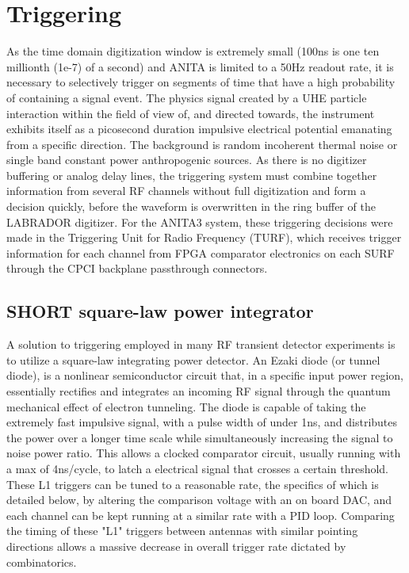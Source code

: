 \section{Triggering}
	As the time domain digitization window is extremely small (100ns is one ten millionth (1e-7) of a second) and ANITA is limited to a 50Hz readout rate, it is necessary to selectively trigger on segments of time that have a high probability of containing a signal event.  The physics signal created by a UHE particle interaction within the field of view of, and directed towards, the instrument exhibits itself as a picosecond duration impulsive electrical potential emanating from a specific direction.  The background is random incoherent thermal noise or single band constant power anthropogenic sources.  As there is no digitizer buffering or analog delay lines, the triggering system must combine together information from several RF channels without full digitization and form a decision quickly, before the waveform is overwritten in the ring buffer of the LABRADOR digitizer.  For the ANITA3 system, these triggering decisions were made in the Triggering Unit for Radio Frequency (TURF), which receives trigger information for each channel from FPGA comparator electronics on each SURF through the CPCI backplane passthrough connectors.
	
	\subsection{SHORT square-law power integrator}
		A solution to triggering employed in many RF transient detector experiments is to utilize a square-law integrating power detector.  An Ezaki diode (or tunnel diode), is a nonlinear semiconductor circuit that, in a specific input power region, essentially rectifies and integrates an incoming RF signal through the quantum mechanical effect of electron tunneling.  The diode is capable of taking the extremely fast impulsive signal, with a pulse width of under 1ns, and distributes the power over a longer time scale while simultaneously increasing the signal to noise power ratio.  This allows a clocked comparator circuit, usually running with a max of 4ns/cycle, to latch a electrical signal that crosses a certain threshold.  These L1 triggers can be tuned to a reasonable rate, the specifics of which is detailed below, by altering the comparison voltage with an on board DAC, and each channel can be kept running at a similar rate with a PID loop.  Comparing the timing of these "L1" triggers between antennas with similar pointing directions allows a massive decrease in overall trigger rate dictated by combinatorics.
		
